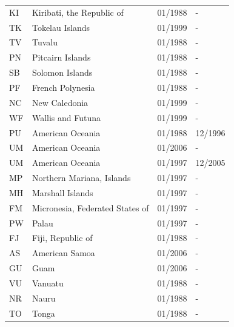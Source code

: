 \begin{scriptsize}
\begin{longtable}{lp{8.8cm}p{2cm}p{2cm}}
	KI & Kiribati, the Republic of       & 01/1988 & -  \\
	TK & Tokelau Islands                 & 01/1999 & -  \\
	TV & Tuvalu                          & 01/1988 & -  \\
	PN & Pitcairn Islands                & 01/1988 & -  \\
	SB & Solomon Islands                 & 01/1988 & -  \\
	PF & French Polynesia                & 01/1988 & -  \\
	NC & New Caledonia                   & 01/1999 & -  \\
	WF & Wallis and Futuna               & 01/1999 & -  \\
	PU & American Oceania                & 01/1988 & 12/1996  \\
	UM & American Oceania                & 01/2006 & -  \\
	UM & American Oceania                & 01/1997 & 12/2005  \\
	MP & Northern Mariana, Islands       & 01/1997 & -  \\
	MH & Marshall Islands                & 01/1997 & -  \\
	FM & Micronesia, Federated States of & 01/1997 & -  \\
	PW & Palau                           & 01/1997 & -  \\
	FJ & Fiji, Republic of               & 01/1988 & -  \\
	AS & American Samoa                  & 01/2006 & -  \\
	GU & Guam                            & 01/2006 & -  \\
	VU & Vanuatu                         & 01/1988 & -  \\
	NR & Nauru                           & 01/1988 & -  \\
	TO & Tonga                           & 01/1988 & -  \\
\end{longtable}
\end{scriptsize}


